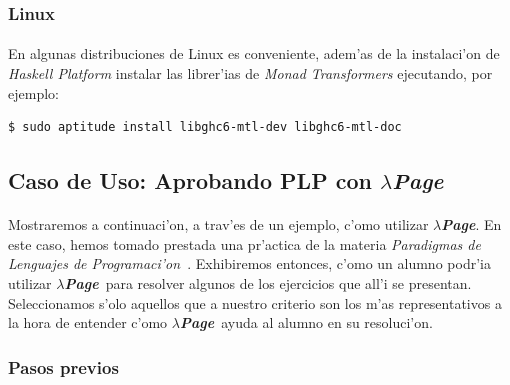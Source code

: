 \documentclass[a4paper]{article}
\newcommand{\hpage}{\textbf{\textsl{$\lambda$Page}}}
\begin{document}
\subsubsection{Linux}
\paragraph{}En algunas distribuciones de Linux es conveniente, adem'as de la instalaci'on de \textsl{Haskell Platform} instalar las librer'ias de \textit{Monad Transformers} ejecutando, por ejemplo:
\begin{center}\begin{lstlisting}
$ sudo aptitude install libghc6-mtl-dev libghc6-mtl-doc
\end{lstlisting}\end{center}
\newpage
\subsection{Caso de Uso: Aprobando PLP con \hpage}
\begin{epigraphs}
\end{epigraphs}
\paragraph{}Mostraremos a continuaci'on, a trav'es de un ejemplo, c'omo utilizar \hpage.  En este caso, hemos tomado prestada una pr'actica de la materia \textsl{Paradigmas de Lenguajes de Programaci'on}~\cite{plp}.  Exhibiremos entonces, c'omo un alumno podr'ia utilizar \hpage\ para resolver algunos de los ejercicios que all'i se presentan.  Seleccionamos s'olo aquellos que a nuestro criterio son los m'as representativos a la hora de entender c'omo \hpage\ ayuda al alumno en su resoluci'on.

\subsubsection{Pasos previos}
\end{document}

